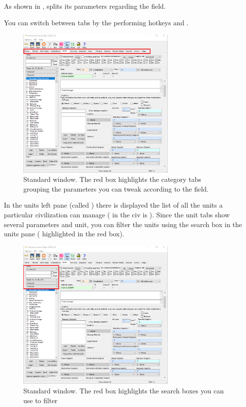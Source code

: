    As shown in , \genie{} splits its parameters regarding the \aoe{} field.

    \begin{info}
        You can switch between tabs by the performing hotkeys  and .
    \end{info}

    \begin{figure}[ht]
        \centering
        \includegraphics[width=0.7\textwidth]{src/images/genie03}
        \caption{Standard \genie{} window. The red box highlights the category tabs grouping the parameters you can tweak according to the \aoe{} field.}
        \label{fig:genie03}
    \end{figure}

    In the units left pane (called ) there is displayed the list of all the units a particular civilization can manage (\eg{} in  the civ is ). Since the unit tabs show several parameters and unit, you can filter the units using the search box in the units pane (\eg{}  highlighted in the red box).

    \begin{figure}[ht]
        \centering
        \includegraphics[width=0.7\textwidth]{src/images/genie02}
        \caption{Standard \genie{} window. The red box highlights the search boxes you can use to filter }
        \label{fig:genie02}
    \end{figure}

